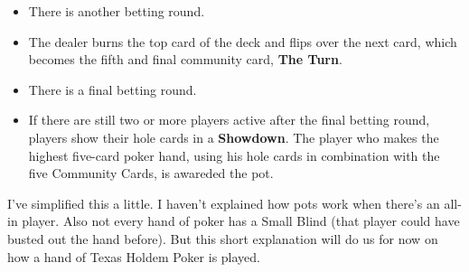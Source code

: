 \begin{itemize}
\item There is another betting round.

\item The dealer burns the top card of the deck and flips over the
  next card, which becomes the fifth and final community card, \textbf{The
    Turn}.

\item There is a final betting round.

\item If there are still two or more players active after the final
  betting round, players show their hole cards in a \textbf{Showdown}.
  The player who makes the highest five-card poker hand, using his
  hole cards in combination with the five Community Cards, is awareded
  the pot.

\end{itemize}

I've simplified this a little. I haven't explained how pots work when
there's an all-in player. Also not every hand of poker has a Small Blind
(that player could have busted out the hand before). But this short
explanation will do us for now on how a hand of Texas Holdem Poker is
played.
